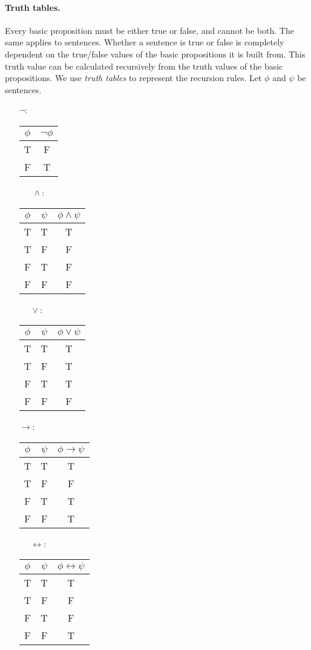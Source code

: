 \documentclass{article}
\theoremstyle{plain}
\begin{document}
\paragraph{Truth tables.} Every basic proposition must be either true or false, and cannot be both. The same applies to sentences. Whether a sentence is true or false is completely dependent on the true/false values of the basic propositions it is built from. This truth value can be calculated recursively from the truth values of the basic propositions. We use \emph{truth tables} to represent the recursion rules. Let $\phi$ and $\psi$ be sentences.
\begin{itemize}
\item[$\neg$:]
\begin{tabular}{ c c  }
 $\phi$ & $\neg \phi$  \\ \hline 
 T & F  \\  
 F & T     
\end{tabular}
      $\phantom{\iff}\wedge$:
\begin{tabular}{ c c c  }
 $\phi$ & $\psi$ & $\phi\wedge \psi$ \\ \hline 
 T & T & T \\  
 T & F & F \\
 F & T & F \\
 F & F & F    
\end{tabular} 
      $\phantom{iff}\vee$: 
\begin{tabular}{ c c c  }
 $\phi$ & $\psi$ & $\phi\vee \psi$ \\ \hline 
 T & T & T \\  
 T & F & T \\
 F & T & T \\
 F & F & F    
\end{tabular} 
\item[$\rightarrow$:] 
\begin{tabular}{ c c c  }
 $\phi$ & $\psi$ & $\phi\rightarrow \psi$ \\ \hline 
 T & T & T \\  
 T & F & F \\
 F & T & T \\
 F & F & T    
\end{tabular} 
$\phantom{iff}\leftrightarrow$:
\begin{tabular}{ c c c  }
 $\phi$ & $\psi$ & $\phi\leftrightarrow \psi$ \\ \hline 
 T & T & T \\  
 T & F & F \\
 F & T & F \\
 F & F & T    
\end{tabular} 
\end{itemize}
\end{document}
